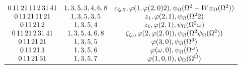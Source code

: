 \documentclass[UTF8]{ctexart}
\newcommand{\W}{\Omega}
\renewcommand{\v}{\varphi}
\newcommand{\p}{\psi}
\newcommand{\pW}{\p_\W}
\newcommand{\w}{\omega}
\newcommand{\e}{\varepsilon}
\newcommand{\z}{\zeta}
\begin{document}
\[\begin{array}{ccc}
  0\,11\,21\,11\,2\,31\,41&1,3,5,3,4,6,8&\e_{\z_0 2},\v(1,\v(2,0)2),\pW(\W^2+W\pW(\W^2))\\
  0\,11\,21\,11\,21&1,3,5,3,5&z_1,\v(2,1),\pW(\W^2 2)\\
  0\,11\,21\,2&1,3,5,4&z_1,\v(2,1),\pW(\W^2\w)\\
  0\,11\,21\,2\,31\,41&1,3,5,4,6,8&\z_{\z_0},\v(2,\v(2,0)),\pW(\W^2\pW(\W^2))\\
  0\,11\,21\,21&1,3,5,5&\v(3,0),\pW(\W^3)\\
  0\,11\,21\,3&1,3,5,6&\v(\w,0),\pW(\W^\w)\\
  0\,11\,21\,31&1,3,5,7&\v(1,0,0),\pW(\W^\W)\\
  \bottomrule
\end{array}
\]
\end{document}

